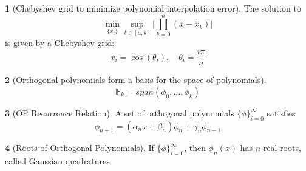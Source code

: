 \documentclass[12pt]{article}
\theoremstyle{definition}
\newtheorem{theorem}{\color{ForestGreen}{\textbf{Theorem}}}
\begin{document}
\begin{theorem}[Chebyshev grid to minimize polynomial interpolation error]
The solution to
\begin{equation}
\min_{\{x_i\}} \sup_{t \in [a,b]} \bigg\lvert \prod_{k=0}^n (x-x_k) \bigg\rvert
\end{equation}
is given by a Chebyshev grid:
\begin{equation}
x_i = \cos (\theta_i), \quad \theta_i = \frac{i\pi}{n}
\end{equation}
\end{theorem}

\begin{theorem}[Orthogonal polynomials form a basis for the space of polynomials]
\begin{equation}
\mathbb{P}_k = span(\phi_0,\ldots,\phi_k)
\end{equation}
\end{theorem}

\begin{theorem}[OP Recurrence Relation]
A set of orthogonal polynomials $\{\phi\}_{i=0}^\infty$ satisfies
\begin{equation}
\phi_{n+1} = (\alpha_n x + \beta_n)\phi_n + \gamma_n \phi_{n-1}
\end{equation}
\end{theorem}

\begin{theorem}[Roots of Orthogonal Polynomials]
If $\{\phi\}_{i=0}^\infty$, then $\phi_n(x)$ has $n$ real roots, called Gaussian quadratures.
\end{theorem}
\end{document}
